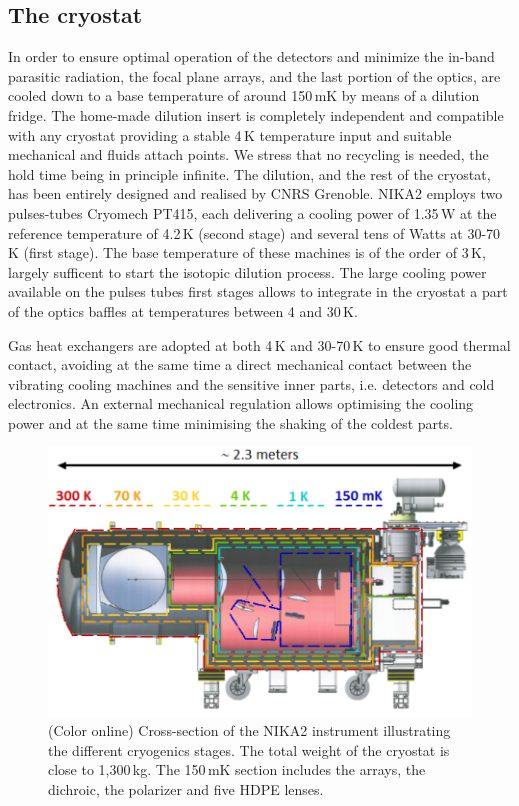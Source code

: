 \documentclass[]{aa} %
\begin{document}
 \subsection{The cryostat}

In order to ensure optimal operation of the detectors and minimize the in-band
parasitic radiation, the focal plane arrays, and the last portion of the optics,
are cooled down to a base temperature of around 150\,mK by means of a dilution
fridge. The home-made dilution insert is completely independent and compatible
with any cryostat providing a stable 4\,K temperature input and suitable
mechanical and fluids attach points. We stress that no recycling is needed, the
hold time being in principle infinite. The dilution, and the rest of the
cryostat, has been entirely designed and realised by CNRS Grenoble. NIKA2
employs two pulses-tubes Cryomech PT415, each delivering a cooling power of
1.35\,W at the reference temperature of 4.2\,K (second stage) and several tens
of Watts at 30-70\,K (first stage). The base temperature of these machines is of
the order of 3\,K, largely sufficent to start the isotopic dilution process. The
large cooling power available on the pulses tubes first stages allows to
integrate in the cryostat a part of the optics baffles at temperatures between 4
and 30\,K.

Gas heat exchangers are adopted at both 4\,K and 30-70\,K to ensure good thermal
contact, avoiding at the same time a direct mechanical contact between the
vibrating cooling machines and the sensitive inner parts, i.e. detectors and
cold electronics. An external mechanical regulation allows optimising the
cooling power and at the same time minimising the shaking of the coldest parts.

\begin{figure}[h]
   \centering
   \includegraphics[width=.95\linewidth]{NIKA2_cryoStages.png}
      \caption{(Color online) Cross-section of the NIKA2 instrument illustrating the different cryogenics stages. The total weight of the cryostat is close to 1,300\,kg. The 150\,mK section includes the arrays, the dichroic, the polarizer and five HDPE lenses.}
         \label{Cryostat_cryo}
\end{figure}
\end{document}
